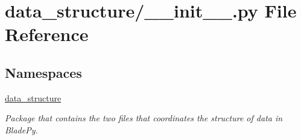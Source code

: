 \hypertarget{a00314}{}\section{data\+\_\+structure/\+\_\+\+\_\+init\+\_\+\+\_\+.py File Reference}
\label{a00314}
\subsection*{Namespaces}
\begin{DoxyCompactItemize}
\item 
 \hyperlink{a00051}{data\+\_\+structure}
\begin{DoxyCompactList}\small\item\em Package that contains the two files that coordinates the structure of data in Blade\+Py. \end{DoxyCompactList}\end{DoxyCompactItemize}
